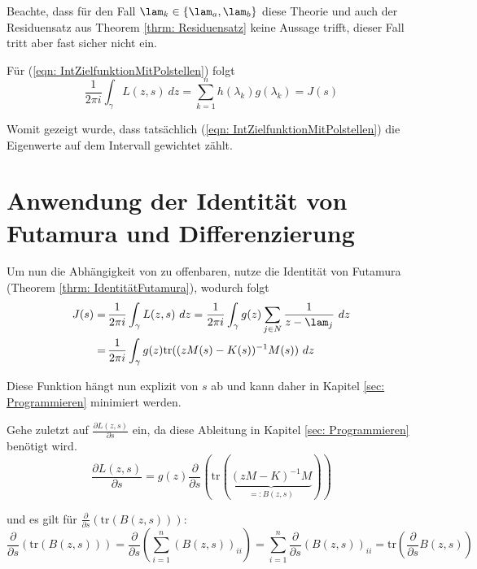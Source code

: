 \documentclass[a4paper,12pt]{report}
\newcommand{\zitat}[1]{\glqq #1\grqq}
\newcommand{\klammer}[1]{\left(#1\right)}
\newcommand{\tr}{\text{tr}}
\newcommand{\inv}{^{-1}}
\newcommand{\1}{\mathds{1}}
\theoremstyle{plain} %
\theoremstyle{definition} %
\theoremstyle{remark}
\begin{document}
            Beachte, dass für den Fall $\lam_k \in \{\lam_a, \lam_b\}$ diese Theorie und auch der Residuensatz aus Theorem \ref{thrm: Residuensatz}
            keine Aussage trifft, dieser Fall tritt aber fast sicher nicht ein.

            Für (\ref{eqn: IntZielfunktionMitPolstellen}) folgt
            $$\frac 1 {2\pi i}\int_\gamma L(z,s)\ dz = \sum_{k=1}^{n} h(\lambda_k) g(\lambda_k) = J(s)$$

            Womit gezeigt wurde, dass tatsächlich (\ref{eqn: IntZielfunktionMitPolstellen}) die Eigenwerte auf dem Intervall gewichtet zählt.

      \section{Anwendung der Identität von Futamura und Differenzierung}
            
            Um nun die Abhängigkeit von \s zu offenbaren, nutze die Identität von Futamura (Theorem \ref{thrm: IdentitätFutamura}), wodurch folgt     
            \begin{align}
                  J(s) =&\, \frac 1 {2\pi i}\int_\gamma L(z,s)\ dz = \frac 1 {2\pi i}\int_\gamma g(z)\sum_{j\in N} \frac{1}{z-\lam_j}\ dz\nonumber\\
                  =&\, \frac 1 {2\pi i}\int_\gamma g(z)\tr((zM(s)-K(s))\inv M(s))\ dz\label{eqn: JGleichIntTr}
            \end{align}

            Diese Funktion hängt nun explizit von $s$ ab und kann daher in Kapitel \ref{sec: Programmieren} minimiert werden.
            
            Gehe zuletzt auf $\frac{\partial L(z,s)}{\partial s}$ ein, da diese Ableitung in Kapitel \ref{sec: Programmieren} benötigt wird.
            \begin{equation}
                  \label{eqn: AbleitungZielfunktion}
                  \frac{\partial L(z,s)}{\partial s} = g(z) \frac{\partial}{\partial s}\klammer{\tr(\underbrace{(zM-K)\inv M}_{=:B(z, s)})}
            \end{equation}

            und es gilt für $\frac{\partial}{\partial s} \klammer{\tr(B(z, s))}$:
            $$\frac{\partial}{\partial s} \klammer{\tr(B(z, s))} = \frac{\partial}{\partial s} \klammer{\sum_{i=1}^n (B(z, s))_{ii}}
            = \sum_{i=1}^n \frac{\partial}{\partial s} (B(z,s))_{ii} = \tr\klammer{\frac{\partial}{\partial s} B(z,s)}$$
            
\end{document}
